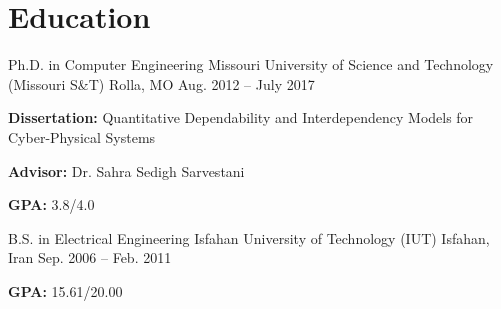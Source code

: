 \section{Education}
\begin{cventries}
  \cventry
    {Ph.D. in Computer Engineering}
    {Missouri University of Science and Technology (Missouri S\&T)}
    {Rolla, MO}
    {Aug. 2012 -- July 2017}
    {
      \begin{cvitems}
        \ifcv
          \item \textbf{Dissertation:} Quantitative Dependability and Interdependency Models for Cyber-Physical Systems
          \item \textbf{Advisor:} Dr. Sahra Sedigh Sarvestani
          \item \textbf{GPA:} 3.8/4.0
        \fi
      \end{cvitems}
    }
  \cventry
    {B.S. in Electrical Engineering}
    {Isfahan University of Technology (IUT)}
    {Isfahan, Iran}
    {Sep. 2006 -- Feb. 2011}
    {
      \ifcv
        \begin{cvitems}
          \item \textbf{GPA:} 15.61/20.00
        \end{cvitems}
      \fi
    }
\end{cventries} 